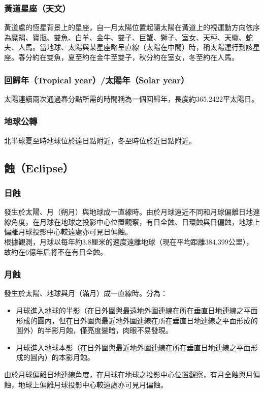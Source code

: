 \documentclass[a4paper,12pt]{report}
\begin{document}
\subsubsection{黃道星座（天文）}
黃道處的恆星背景上的星座，自一月太陽位置起隨太陽在黃道上的視運動方向依序為魔羯、寶瓶、雙魚、白羊、金牛、雙子、巨蟹、獅子、室女、天秤、天蠍、蛇夫、人馬。當地球、太陽與某星座略呈直線（太陽在中間）時，稱太陽運行到該星座。春分約在雙魚，夏至約在金牛至雙子，秋分約在室女，冬至約在人馬。
\subsubsection{回歸年（Tropical year）/太陽年（Solar year）}
太陽連續兩次通過春分點所需的時間稱為一個回歸年，長度約365.2422平太陽日。
\subsubsection{地球公轉}
北半球夏至時地球位於遠日點附近，冬至時位於近日點附近。
\subsection{蝕（Eclipse）}
\subsubsection{日蝕}
發生於太陽、月（朔月）與地球成一直線時。由於月球遠近不同和月球偏離日地連線角度，在月球在地球之投影中心位置觀察，有日全蝕、日環蝕與日偏蝕，地球上偏離月球投影中心較遠處亦可見日偏蝕。\\
根據觀測，月球以每年約3.8厘米的速度遠離地球（現在平均距離384,399公里），故約在6億年后將不在有日全蝕。
\subsubsection{月蝕}
發生於太陽、地球與月（滿月）成一直線時。分為：
\begin{itemize}
\item 月球進入地球的半影（在日外圍與最遠地外圍連線在所在垂直日地連線之平面形成的圓內，但在日外圍與最近地外圍連線在所在垂直日地連線之平面形成的圓外）的半影月蝕，僅亮度變暗，肉眼不易發現。
\item 月球進入地球本影（在日外圍與最近地外圍連線在所在垂直日地連線之平面形成的圓內）的本影月蝕。
\end{itemize}
由於月球偏離日地連線角度，在月球在地球之投影中心位置觀察，有月全蝕與月偏蝕，地球上偏離月球投影中心較遠處亦可見月偏蝕。
\end{document}
